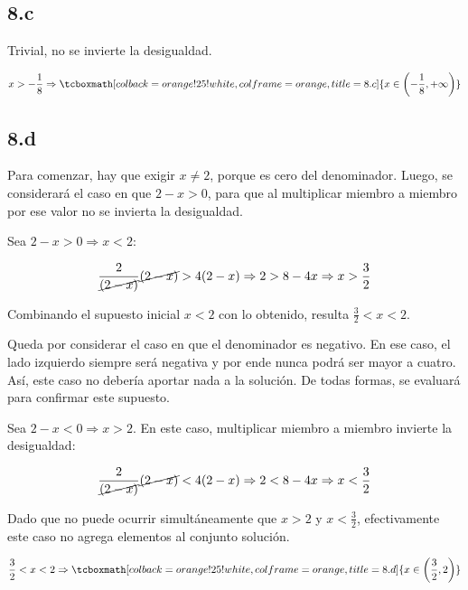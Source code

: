 \documentclass{article}
\begin{document}
\subsection*{8.c}
\label{subsec:8.c}

Trivial, no se invierte la desigualdad.

\begin{equation}
x > -\frac{1}{8} \Rightarrow \tcboxmath[colback=orange!25!white,colframe=orange, title=8.c] { x \in \left(-\frac{1}{8}, +\infty \right) }
\end{equation}

\subsection*{8.d}
\label{subsec:8.d}

Para comenzar, hay que exigir $x \neq 2$, porque es cero del denominador. Luego, se considerará el caso en que $2-x > 0$, para que al multiplicar miembro a miembro por ese valor no se invierta la desigualdad.

Sea $2 - x > 0 \Rightarrow x < 2$:

\begin{equation}
\frac{2}{\cancel{(2-x)}} \cancel{(2-x)} > 4 (2-x) \Rightarrow 2 > 8-4x \Rightarrow x > \frac{3}{2}
\end{equation}

Combinando el supuesto inicial $x < 2$ con lo obtenido, resulta $\frac{3}{2} < x < 2$.

Queda por considerar el caso en que el denominador es negativo. En ese caso, el lado izquierdo siempre será negativa y por ende nunca podrá ser mayor a cuatro. Así, este caso no debería aportar nada a la solución. De todas formas, se evaluará para confirmar este supuesto.

Sea $2 - x < 0 \Rightarrow x > 2$. En este caso, multiplicar miembro a miembro invierte la desigualdad:

\begin{equation}
\frac{2}{\cancel{(2-x)}} \cancel{(2-x)} < 4 (2-x) \Rightarrow 2 < 8-4x \Rightarrow x < \frac{3}{2}
\end{equation}

Dado que no puede ocurrir simultáneamente que $x > 2$ y $x < \frac{3}{2}$, efectivamente este caso no agrega elementos al conjunto solución.

\begin{equation}
\frac{3}{2} < x < 2 \Rightarrow \tcboxmath[colback=orange!25!white,colframe=orange, title=8.d] { x \in \left(\frac{3}{2}, 2 \right) }
\end{equation}
\end{document}
